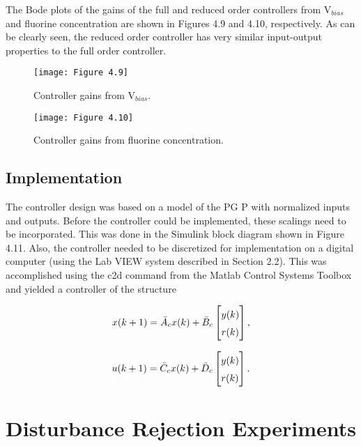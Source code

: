 \noindent The Bode plots of the gains of the full and reduced order controllers from $\text{V}_{bias}$ and fluorine concentration are shown in Figures 4.9 and 4.10, respectively. As can be clearly seen, the reduced order controller has very similar input-output properties to the full order controller.

\begin{figure}[H]
	\centering
	\texttt{[image: Figure 4.9]}
	\bf\caption{ Controller gains from $\text{V}_{bias}.$}
	\label{fig:4.9}
\end{figure}

\begin{figure}[H]
	\centering
	\texttt{[image: Figure 4.10]}
	\bf\caption{ Controller gains from fluorine concentration.}
	\label{fig:4.10}
\end{figure}

\subsection{Implementation}

\tab The controller design was based on a model of the PG P with normalized inputs and
outputs. Before the controller could be implemented, these scalings need to be incorporated.
This was done in the Simulink block diagram shown in Figure 4.11. Also, the controller
needed to be discretized for implementation on a digital computer (using the Lab VIEW
system described in Section 2.2). This was accomplished using the c2d command from the
Matlab Control Systems Toolbox and yielded a controller of the structure


\begin{align*}
	x(k+1) = \bar{A}_{c}x(k) + \bar{B}_{c} \renewcommand\arraystretch{1.5}\begin{bmatrix}
		y(k) \\ r(k)
	\end{bmatrix},
\end{align*}

\begin{align}
	u(k+1) = \bar{C}_{c}x(k) + \bar{D}_{c} \renewcommand\arraystretch{1.5}\begin{bmatrix}
		y(k) \\ r(k)
	\end{bmatrix}.
\end{align}

\section{Disturbance Rejection Experiments}

